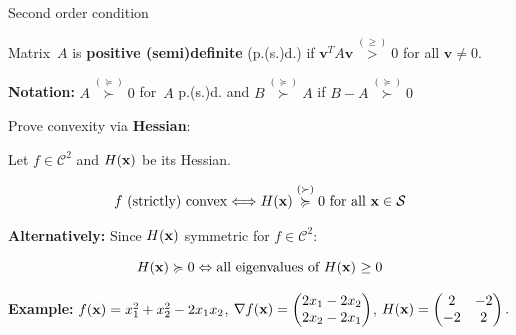 \documentclass[11pt,compress,t,notes=noshow, xcolor=table]{beamer}
\begin{document}
\begin{vbframe}{Second order condition}

Matrix~$A$ is \textbf{positive (semi)definite} (p.(s.)d.) if $\bm{v}^T A \bm{v} \overset{(\geq)}{>} 0$ for all $\bm{v}\not=0.$

\medskip

\textbf{Notation:} $A \overset{(\succcurlyeq)}{\succ} 0$ for~$A$ p.(s.)d. and $B \overset{(\succcurlyeq)}{\succ} A$ if $B-A \overset{(\succcurlyeq)}{\succ} 0$

\lz

Prove convexity via \textbf{Hessian}:

\begin{kframe}
    Let $f \in \mathcal{C}^2$ and $H(\mathbf{x})$ be its Hessian.

    \vspace{-\baselineskip}

    \begin{gather*}
        \textnormal{$f$ (strictly) convex} \Longleftrightarrow H(\mathbf{x}) \overset{(\succ)}{\succcurlyeq} 0 \textnormal{ for all $\mathbf{x} \in \mathcal{S}$}
    \end{gather*}
\end{kframe}

\textbf{Alternatively:} Since $H(\mathbf{x})$ symmetric for $f \in \mathcal{C}^2$:

\vspace{-0.5\baselineskip}

\begin{equation*}
    H(\mathbf{x}) \succcurlyeq 0 \Leftrightarrow \textnormal{all eigenvalues of $H(\mathbf{x})$ $\ge 0$}    
\end{equation*}

\framebreak



\begin{footnotesize}
\textbf{Example:} $f(\mathbf{x}) = x_1^2 + x_2^2 - 2x_1x_2$, $\nabla f(\mathbf{x}) = \begin{pmatrix}2x_1 - 2x_2 \\ 2x_2 - 2x_1\end{pmatrix}$, $H(\mathbf{x}) = \begin{pmatrix} 2 & -2 \\ -2 & 2 \end{pmatrix}. 
$


\end{footnotesize}
\end{vbframe}
\end{document}
